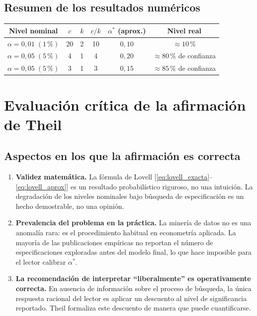 \documentclass[12pt, letterpaper]{article}
\begin{document}
\subsection{Resumen de los resultados numéricos}

\begin{center}
\renewcommand{\arraystretch}{1.4}
\small
\begin{tabular}{cccccc}
\toprule
\textbf{Nivel nominal} & $c$ & $k$ & $c/k$ & $\alpha^*$ (aprox.) & \textbf{Nivel real} \\
\midrule
$\alpha = 0{,}01\;(1\,\%)$  & 20 & 2 & 10 & $0{,}10$  & $\approx 10\,\%$ \\
$\alpha = 0{,}05\;(5\,\%)$  & 4  & 1 & 4  & $0{,}20$  & $\approx 80\,\%$ de confianza \\
$\alpha = 0{,}05\;(5\,\%)$  & 3  & 1 & 3  & $0{,}15$  & $\approx 85\,\%$ de confianza \\
\bottomrule
\end{tabular}
\end{center}

\section{Evaluación crítica de la afirmación de Theil}

\subsection{Aspectos en los que la afirmación es correcta}

\begin{enumerate}[leftmargin=1.8cm, label=\textbf{\arabic*.}]

  \item \textbf{Validez matemática.} La fórmula de Lovell
    [\eqref{eq:lovell_exacta}--\eqref{eq:lovell_aprox}] es un resultado
    probabilístico riguroso, no una intuición. La degradación de los
    niveles nominales bajo búsqueda de especificación es un hecho
    demostrable, no una opinión.

  \item \textbf{Prevalencia del problema en la práctica.} La minería
    de datos no es una anomalía rara: es el procedimiento habitual
    en econometría aplicada. La mayoría de las publicaciones empíricas
    no reportan el número de especificaciones exploradas antes del
    modelo final, lo que hace imposible para el lector calibrar
    $\alpha^*$.

  \item \textbf{La recomendación de interpretar ``liberalmente'' es
    operativamente correcta.} En ausencia de información sobre el
    proceso de búsqueda, la única respuesta racional del lector es
    aplicar un descuento al nivel de significancia reportado. Theil
    formaliza este descuento de manera que puede cuantificarse.

\end{enumerate}
\end{document}
